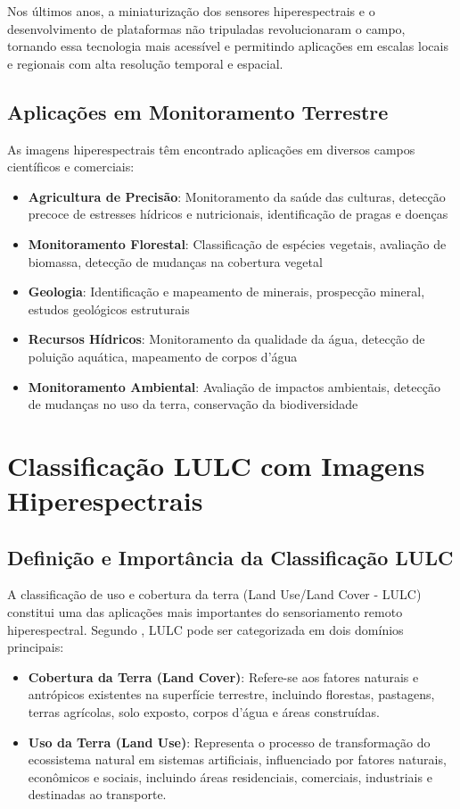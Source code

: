 Nos últimos anos, a miniaturização dos sensores hiperespectrais e o desenvolvimento de plataformas não tripuladas revolucionaram o campo, tornando essa tecnologia mais acessível e permitindo aplicações em escalas locais e regionais com alta resolução temporal e espacial.

\subsection{Aplicações em Monitoramento Terrestre}
As imagens hiperespectrais têm encontrado aplicações em diversos campos científicos e comerciais:

\begin{itemize}
    \item \textbf{Agricultura de Precisão}: Monitoramento da saúde das culturas, detecção precoce de estresses hídricos e nutricionais, identificação de pragas e doenças \cite{Shin2024}
    \item \textbf{Monitoramento Florestal}: Classificação de espécies vegetais, avaliação de biomassa, detecção de mudanças na cobertura vegetal
    \item \textbf{Geologia}: Identificação e mapeamento de minerais, prospecção mineral, estudos geológicos estruturais
    \item \textbf{Recursos Hídricos}: Monitoramento da qualidade da água, detecção de poluição aquática, mapeamento de corpos d'água
    \item \textbf{Monitoramento Ambiental}: Avaliação de impactos ambientais, detecção de mudanças no uso da terra, conservação da biodiversidade
\end{itemize}

\section{Classificação LULC com Imagens Hiperespectrais}\label{sec:classificacao_lulc}

\subsection{Definição e Importância da Classificação LULC}
A classificação de uso e cobertura da terra (Land Use/Land Cover - LULC) constitui uma das aplicações mais importantes do sensoriamento remoto hiperespectral. Segundo \cite{Lou2024}, LULC pode ser categorizada em dois domínios principais:

\begin{itemize}
    \item \textbf{Cobertura da Terra (Land Cover)}: Refere-se aos fatores naturais e antrópicos existentes na superfície terrestre, incluindo florestas, pastagens, terras agrícolas, solo exposto, corpos d'água e áreas construídas.
    \item \textbf{Uso da Terra (Land Use)}: Representa o processo de transformação do ecossistema natural em sistemas artificiais, influenciado por fatores naturais, econômicos e sociais, incluindo áreas residenciais, comerciais, industriais e destinadas ao transporte.
\end{itemize}

